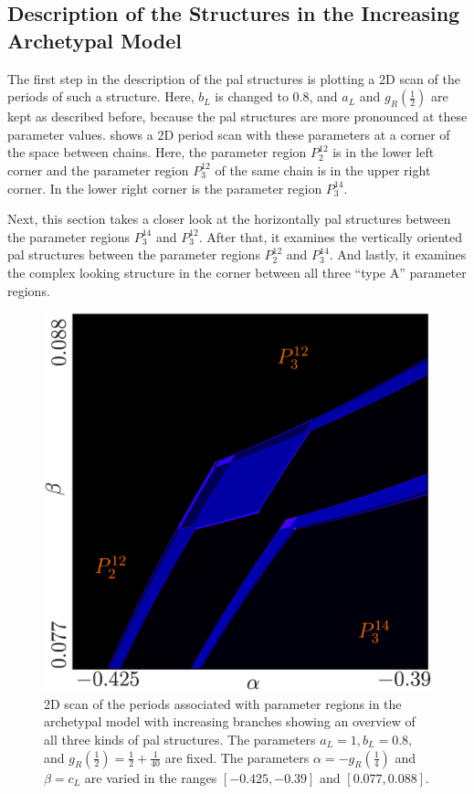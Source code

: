 \subsection{Description of the Structures in the Increasing Archetypal Model}
\label{sec:add.add.like}

The first step in the description of the \gls{pal} structures is plotting a 2D scan of the periods of such a structure.
Here, $b_L$ is changed to $0.8$, and $a_L$ and $g_R\left(\frac{1}{2}\right)$ are kept as described before, because the \gls{pal} structures are more pronounced at these parameter values.
 shows a 2D period scan with these parameters at a corner of the space between chains.
Here, the parameter region $P^{12}_2$ is in the lower left corner and the parameter region $P^{12}_3$ of the same chain is in the upper right corner.
In the lower right corner is the parameter region $P^{14}_3$.

Next, this section takes a closer look at the horizontally \gls{pal} structures between the parameter regions $P^{14}_3$ and $P^{12}_3$.
After that, it examines the vertically oriented \gls{pal} structures between the parameter regions $P^{12}_2$ and $P^{14}_3$.
And lastly, it examines the complex looking structure in the corner between all three ``type A'' parameter regions.

\begin{figure}
	\centering
	\includegraphics[width=.7 \textwidth]{../Figures/7/7.11/result.png}
	\caption[2D scan of the periods associated with parameter regions in the archetypal model with increasing branches showing an overview of all three kinds of period-adding-like structures]{
		2D scan of the periods associated with parameter regions in the archetypal model with increasing branches showing an overview of all three kinds of \gls{pal} structures.
		The parameters $a_L = 1, b_L = 0.8,$ and $g_R\left(\frac{1}{2}\right) = \frac{1}{2} + \frac{1}{40}$ are fixed.
		The parameters $\alpha = -g_R\left(\frac{1}{4}\right)$ and $\beta = c_L$ are varied in the ranges $[-0.425, -0.39]$ and $[0.077, 0.088]$.
	}
	\label{fig:add.add.like}
\end{figure}

